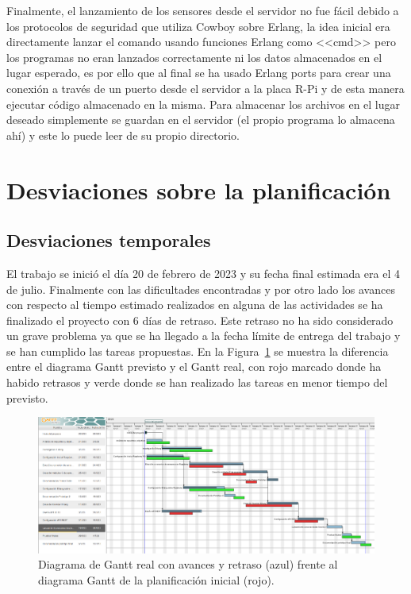 Finalmente, el lanzamiento de los sensores desde el servidor no fue fácil debido a los protocolos de seguridad que utiliza Cowboy sobre Erlang, la idea inicial era directamente lanzar el comando usando funciones Erlang como <<cmd>> pero los programas no eran lanzados correctamente ni los datos almacenados en el lugar esperado, es por ello que al final se ha usado Erlang ports para crear una conexión a través de un puerto desde el servidor a la placa R-Pi y de esta manera ejecutar código almacenado en la misma. Para almacenar los archivos en el lugar deseado simplemente se guardan en el servidor (el propio programa lo almacena ahí) y este lo puede leer de su propio directorio.


\section{Desviaciones sobre la planificación}

\subsection{Desviaciones temporales}
El trabajo se inició el día 20 de febrero de 2023 y su fecha final estimada era el 4 de julio. Finalmente con las dificultades encontradas y por otro lado los avances con respecto al tiempo estimado realizados en alguna de las actividades se ha finalizado el proyecto con 6 días de retraso. Este retraso no ha sido considerado un grave problema ya que se ha llegado a la fecha límite de entrega del trabajo y se han cumplido las tareas propuestas.
En la Figura~\ref{fig:gantReal} se muestra la diferencia entre el diagrama Gantt previsto y el Gantt real, con rojo marcado donde ha habido retrasos y verde donde se han realizado las tareas en menor tiempo del previsto.

\begin{figure}[h]
\centering
\includegraphics[scale=0.48]{images/gantProyectReal.png}
\caption[Diagrama de Gantt final]{Diagrama de Gantt real con avances y retraso (azul) frente al diagrama Gantt de la planificación inicial (rojo).}%
\label{fig:gantReal}
\end{figure}

